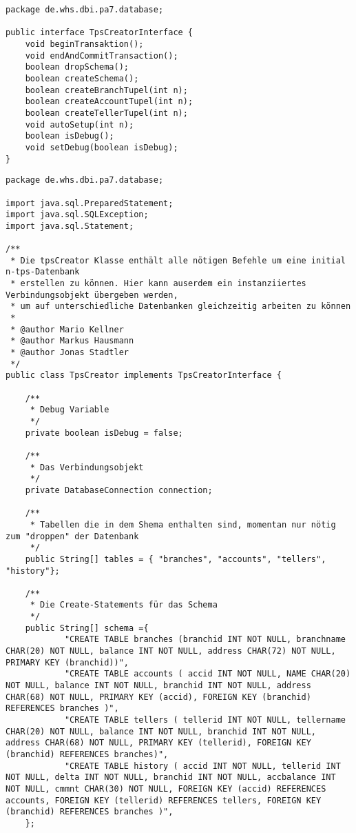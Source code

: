 \begin{lstlisting}[caption={TpsCreatorInterface (optimiert)}, label={lst:tpsiv2}]
package de.whs.dbi.pa7.database;

public interface TpsCreatorInterface {
	void beginTransaktion();
	void endAndCommitTransaction();
	boolean dropSchema();
	boolean createSchema();
	boolean createBranchTupel(int n);
	boolean createAccountTupel(int n);
	boolean createTellerTupel(int n);
	void autoSetup(int n);
	boolean isDebug();
	void setDebug(boolean isDebug);
}
\end{lstlisting}

\begin{lstlisting}[caption={TpsCreator (optimiert)}, label={lst:tpsv2}]
package de.whs.dbi.pa7.database;

import java.sql.PreparedStatement;
import java.sql.SQLException;
import java.sql.Statement;

/**
 * Die tpsCreator Klasse enthält alle nötigen Befehle um eine initial n-tps-Datenbank
 * erstellen zu können. Hier kann auserdem ein instanziiertes Verbindungsobjekt übergeben werden,
 * um auf unterschiedliche Datenbanken gleichzeitig arbeiten zu können
 * 
 * @author Mario Kellner
 * @author Markus Hausmann
 * @author Jonas Stadtler
 */
public class TpsCreator implements TpsCreatorInterface {
	
	/**
	 * Debug Variable
	 */
	private boolean isDebug = false;
	
	/**
	 * Das Verbindungsobjekt
	 */
	private DatabaseConnection connection;
	
	/**
	 * Tabellen die in dem Shema enthalten sind, momentan nur nötig zum "droppen" der Datenbank
	 */
	public String[] tables = { "branches", "accounts", "tellers", "history"};
	
	/**
	 * Die Create-Statements für das Schema
	 */
	public String[] schema ={
			"CREATE TABLE branches (branchid INT NOT NULL, branchname CHAR(20) NOT NULL, balance INT NOT NULL, address CHAR(72) NOT NULL, PRIMARY KEY (branchid))",
			"CREATE TABLE accounts ( accid INT NOT NULL, NAME CHAR(20) NOT NULL, balance INT NOT NULL, branchid INT NOT NULL, address CHAR(68) NOT NULL, PRIMARY KEY (accid), FOREIGN KEY (branchid) REFERENCES branches )",
			"CREATE TABLE tellers ( tellerid INT NOT NULL, tellername CHAR(20) NOT NULL, balance INT NOT NULL, branchid INT NOT NULL, address CHAR(68) NOT NULL, PRIMARY KEY (tellerid), FOREIGN KEY (branchid) REFERENCES branches)",
			"CREATE TABLE history ( accid INT NOT NULL, tellerid INT NOT NULL, delta INT NOT NULL, branchid INT NOT NULL, accbalance INT NOT NULL, cmmnt CHAR(30) NOT NULL, FOREIGN KEY (accid) REFERENCES accounts, FOREIGN KEY (tellerid) REFERENCES tellers, FOREIGN KEY (branchid) REFERENCES branches )",
	};
	

\end{lstlisting}
